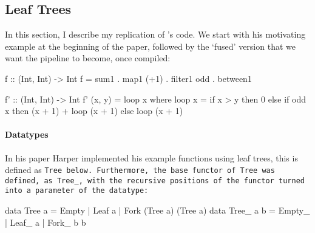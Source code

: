 \long{}
\subsection{Leaf Trees}
In this section, I describe my replication of \cite{Harper2011}'s code.
We start with his motivating example at the beginning of the paper, followed by the `fused' version that we want the pipeline to become, once compiled:
\begin{code}
f :: (Int, Int) -> Int
f = sum1 . map1 (+1) . filter1 odd . between1

f' :: (Int, Int) -> Int
f' (x, y) = loop x
  where loop x = if x > y
                 then 0
                 else if odd x
                      then (x + 1) + loop (x + 1)
                      else loop (x + 1)
\end{code}
\paragraph{Datatypes} In his paper Harper implemented his example functions using leaf trees, this is defined as \tt{Tree} below.
Furthermore, the base functor of \tt{Tree} was defined, as \tt{Tree\_}, with the recursive positions of the functor turned into a parameter of the datatype:
\begin{code}
data Tree a = Empty | Leaf a | Fork (Tree a) (Tree a)
data Tree_ a b = Empty_ | Leaf_ a | Fork_ b b
\end{code}
